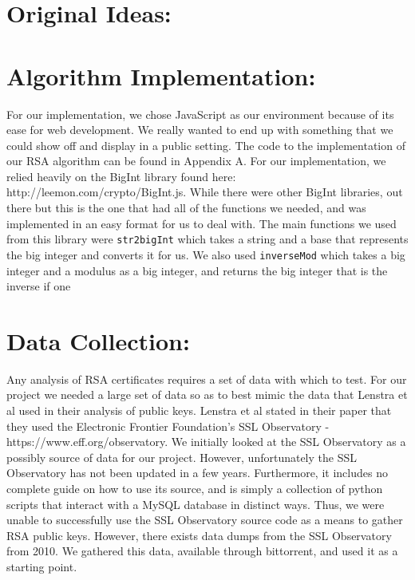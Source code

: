 \documentclass[12pt]{article}
\newcommand{\ty}[1]{\texttt{#1}}
\begin{document}
\section{Original Ideas:}

\section{Algorithm Implementation:}
For our implementation, we chose JavaScript as our environment because of its
ease for web development. We really wanted to end up with something that we
could show off and display in a public setting. The code to the implementation
of our RSA algorithm can be found in Appendix A. For our implementation, we
relied heavily on the BigInt library found here: 
http://leemon.com/crypto/BigInt.js.
While there were other BigInt libraries, out there but this is the one that had
all of the functions we needed, and was implemented in an easy format for us to
deal with. The main functions we used from this library were \ty{str2bigInt}
which takes a string and a base that represents the big integer and converts it
for us. We also used \ty{inverseMod} which takes a big integer and a modulus as
a big integer, and returns the big integer that is the inverse if one 

\section{Data Collection:}
Any analysis of RSA certificates requires a set of data with which to test. For our project we needed a large set of data so as to best mimic the data that Lenstra
et al used in their analysis of public keys. Lenstra et al stated in their paper that they used the Electronic Frontier Foundation's SSL Observatory - https://www.eff.org/observatory. We initially looked at the SSL Observatory as a possibly source of data for our project. However, unfortunately the SSL Observatory has not been updated in a few years. Furthermore, it includes no complete guide on how to use its source, and is simply a collection of python scripts that interact with a MySQL database in distinct ways. Thus, we were unable to successfully use the SSL Observatory source code as a means to gather RSA public keys. However, there exists data dumps from the SSL Observatory from 2010. We gathered this data, available through bittorrent, and used it as a starting point.
\end{document}
